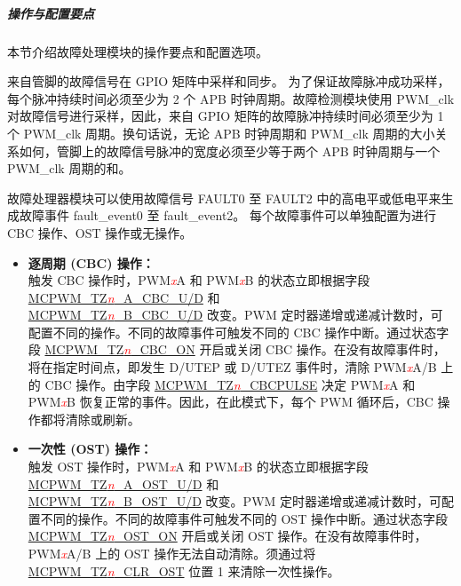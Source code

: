 \documentclass[main\_\_CN.tex]{subfiles}
\begin{document}
\subparagraph{操作与配置要点}
本节介绍故障处理模块的操作要点和配置选项。

来自管脚的故障信号在 GPIO 矩阵中采样和同步。 为了保证故障脉冲成功采样，每个脉冲持续时间必须至少为 2 个 APB 时钟周期。故障检测模块使用 PWM\_clk 对故障信号进行采样，因此，来自 GPIO 矩阵的故障脉冲持续时间必须至少为 1 个 PWM\_clk 周期。换句话说，无论 APB 时钟周期和 PWM\_clk 周期的大小关系如何，管脚上的故障信号脉冲的宽度必须至少等于两个 APB 时钟周期与一个 PWM\_clk 周期的和。

故障处理器模块可以使用故障信号 FAULT0 至 FAULT2 中的高电平或低电平来生成故障事件 fault\_event0 至 fault\_event2。 每个故障事件可以单独配置为进行 CBC 操作、OST 操作或无操作。
\begin{itemize}
    \item {\bfseries 逐周期 (CBC) 操作：}\\
    触发 CBC 操作时，PWM\textcolor{red}{\it{x}}A 和 PWM\textcolor{red}{\it{x}}B 的状态立即根据字段 \hyperref[fielddesc:MCPWMTZNACBCU]{MCPWM\_TZ\textcolor{red}{\it{n}}\_A\_CBC\_U/D} 和 \\\hyperref[fielddesc:MCPWMTZNBCBCU]{MCPWM\_TZ\textcolor{red}{\it{n}}\_B\_CBC\_U/D} 改变。PWM 定时器递增或递减计数时，可配置不同的操作。不同的故障事件可触发不同的 CBC 操作中断。通过状态字段 \hyperref[fielddesc:MCPWMTZNCBCON]{MCPWM\_TZ\textcolor{red}{\it{n}}\_CBC\_ON} 开启或关闭 CBC 操作。在没有故障事件时，将在指定时间点，即发生 D/UTEP 或 D/UTEZ 事件时，清除 PWM\textcolor{red}{\it{x}}A/B 上的 CBC 操作。由字段 \hyperref[fielddesc:MCPWMTZNCBCPULSE]{MCPWM\_TZ\textcolor{red}{\it{n}}\_CBCPULSE} 决定 PWM\textcolor{red}{\it{x}}A 和 PWM\textcolor{red}{\it{x}}B 恢复正常的事件。因此，在此模式下，每个 PWM 循环后，CBC 操作都将清除或刷新。
    \item {\bfseries 一次性 (OST) 操作：}\\
	触发 OST 操作时，PWM\textcolor{red}{\it{x}}A 和 PWM\textcolor{red}{\it{x}}B 的状态立即根据字段 \hyperref[fielddesc:MCPWMTZNAOSTU]{MCPWM\_TZ\textcolor{red}{\it{n}}\_A\_OST\_U/D} 和 \\\hyperref[fielddesc:MCPWMTZNBOSTU]{MCPWM\_TZ\textcolor{red}{\it{n}}\_B\_OST\_U/D} 改变。PWM 定时器递增或递减计数时，可配置不同的操作。不同的故障事件可触发不同的 OST 操作中断。通过状态字段  \hyperref[fielddesc:MCPWMTZNOSTON]{MCPWM\_TZ\textcolor{red}{\it{n}}\_OST\_ON} 开启或关闭 OST 操作。在没有故障事件时，PWM\textcolor{red}{\it{x}}A/B 上的 OST 操作无法自动清除。须通过将 \hyperref[fielddesc:MCPWMTZNCLROST]{MCPWM\_TZ\textcolor{red}{\it{n}}\_CLR\_OST} 位置 1 来清除一次性操作。
\end{itemize}
\end{document}
